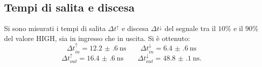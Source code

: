 \subsection{Tempi di salita e discesa}
Si sono misurati i tempi di salita $\Delta t^{\uparrow}$ e discesa $\Delta t^{\downarrow}$ del segnale tra il $10 \% $ e il $90 \% $ del valore HIGH, sia in ingresso che in uscita. Si è ottenuto:
$$ \Delta t_{in}^{\uparrow}=\SI{12.2(6)}{\nano \second} \qquad \Delta t_{in}^{\downarrow}=\SI{6.4(6)}{\nano \second} $$
$$ \Delta t_{out}^{\uparrow}=\SI{16.4(6)}{\nano \second} \qquad \Delta t_{out}^{\downarrow}=\SI{48.8(1)}{\nano \second}.$$
